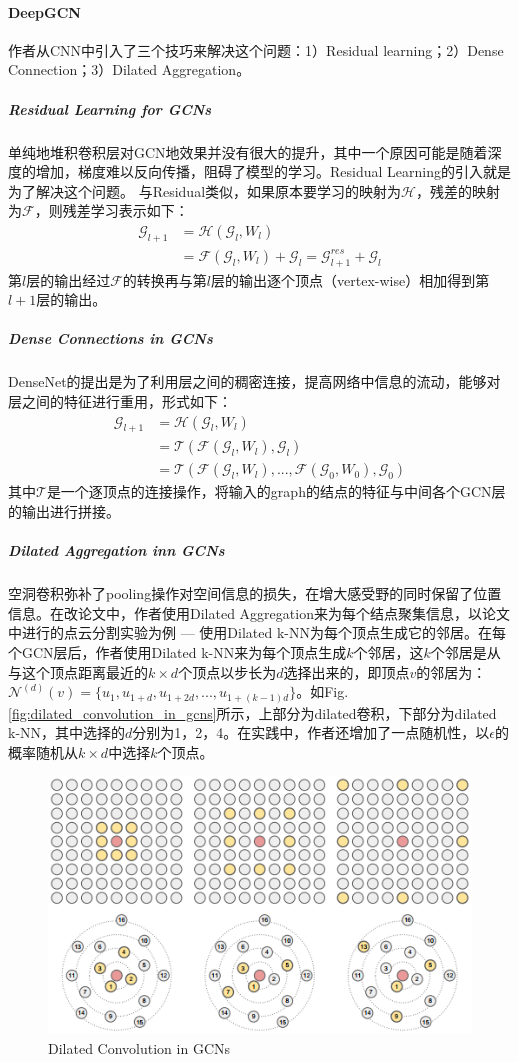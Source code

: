 \paragraph{DeepGCN}
作者从CNN中引入了三个技巧来解决这个问题：1）Residual learning；2）Dense Connection；3）Dilated Aggregation。

\subparagraph{Residual Learning for GCNs}
单纯地堆积卷积层对GCN地效果并没有很大的提升，其中一个原因可能是随着深度的增加，梯度难以反向传播，阻碍了模型的学习。Residual Learning的引入就是为了解决这个问题。
与Residual类似，如果原本要学习的映射为$\mathcal{H}$，残差的映射为$\mathcal{F}$，则残差学习表示如下：
$$
\begin{aligned}
	\mathcal{G}_{l+1} &= \mathcal{H}(\mathcal{G}_l, W_l)	\\
					  &= \mathcal{F}(\mathcal{G}_l, W_l) + \mathcal{G}_l = \mathcal{G}_{l+1}^{res} + \mathcal{G}_l
\end{aligned}
$$
第$l$层的输出经过$\mathcal{F}$的转换再与第$l$层的输出逐个顶点（vertex-wise）相加得到第$l+1$层的输出。

\subparagraph{Dense Connections in GCNs}
DenseNet的提出是为了利用层之间的稠密连接，提高网络中信息的流动，能够对层之间的特征进行重用，形式如下：
$$
\begin{aligned}
	\mathcal{G}_{l+1} &= \mathcal{H}(\mathcal{G}_l, W_l) \\
	  				  &= \mathcal{T}(\mathcal{F}(\mathcal{G}_l, W_l), \mathcal{G}_l) \\
	  				  &= \mathcal{T}(\mathcal{F}(\mathcal{G}_l, W_l), ..., \mathcal{F}(\mathcal{G}_0, W_0), \mathcal{G}_0)
\end{aligned}
$$
其中$\mathcal{T}$是一个逐顶点的连接操作，将输入的graph的结点的特征与中间各个GCN层的输出进行拼接。


\subparagraph{Dilated Aggregation inn GCNs}
空洞卷积弥补了pooling操作对空间信息的损失，在增大感受野的同时保留了位置信息。在改论文中，作者使用Dilated Aggregation来为每个结点聚集信息，以论文中进行的点云分割实验为例 --- 使用Dilated k-NN为每个顶点生成它的邻居。在每个GCN层后，作者使用Dilated k-NN来为每个顶点生成$k$个邻居，这$k$个邻居是从与这个顶点距离最近的$k \times d$个顶点以步长为$d$选择出来的，即顶点$v$的邻居为：$\mathcal{N}^{(d)}(v) = \{u_1, u_{1+d}, u_{1+2d}, ..., u_{1+(k-1)d}\}$。如Fig.\ref{fig:dilated_convolution_in_gcns}所示，上部分为dilated卷积，下部分为dilated k-NN，其中选择的$d$分别为1，2，4。在实践中，作者还增加了一点随机性，以$\epsilon$的概率随机从$k \times d$中选择$k$个顶点。

\begin{figure}[h]
	\centering
	\includegraphics[width=.6\textwidth]{pics/Dilated-Convolution-in-GCNs.png}
	\caption{Dilated Convolution in  GCNs}
	\label{figz:dilated_convolution_in_gcns}
\end{figure}

